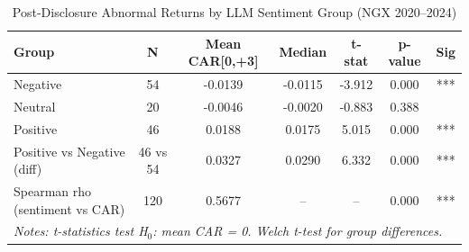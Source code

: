 
\begin{table}[h]
\centering
\caption{Post-Disclosure Abnormal Returns by LLM Sentiment Group (NGX 2020--2024)}
\label{tab:group_tests}
\begin{tabular}{lcccccc}
\hline
\textbf{Group} & \textbf{N} & \textbf{Mean CAR[0,+3]} & \textbf{Median} & \textbf{t-stat} & \textbf{p-value} & \textbf{Sig} \\
\hline
Negative & 54 & -0.0139 & -0.0115 & -3.912 & 0.000 & *** \\
Neutral & 20 & -0.0046 & -0.0020 & -0.883 & 0.388 &  \\
Positive & 46 & 0.0188 & 0.0175 & 5.015 & 0.000 & *** \\
Positive vs Negative (diff) & 46 vs 54 & 0.0327 & 0.0290 & 6.332 & 0.000 & *** \\
Spearman rho (sentiment vs CAR) & 120 & 0.5677 & -- & -- & 0.000 & *** \\
\hline
\multicolumn{7}{l}{\textit{Notes: t-statistics test H$_0$: mean CAR = 0. Welch t-test for group differences.}} \\
\end{tabular}
\end{table}
